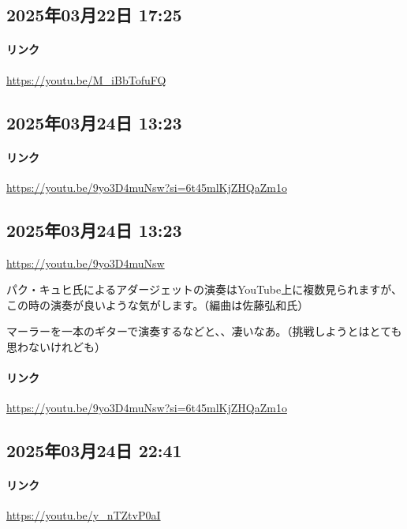 \subsection*{2025年03月22日 17:25}

\paragraph{リンク}
\url{https://youtu.be/M_iBbTofuFQ}

\subsection*{2025年03月24日 13:23}

\paragraph{リンク}
\url{https://youtu.be/9yo3D4muNsw?si=6t45mlKjZHQaZm1o}

\subsection*{2025年03月24日 13:23}

\url{https://youtu.be/9yo3D4muNsw}

パク・キュヒ氏によるアダージェットの演奏はYouTube上に複数見られますが、この時の演奏が良いような気がします。（編曲は佐藤弘和氏）

マーラーを一本のギターで演奏するなどと、、凄いなあ。（挑戦しようとはとても思わないけれども）

\paragraph{リンク}
\url{https://youtu.be/9yo3D4muNsw?si=6t45mlKjZHQaZm1o}

\subsection*{2025年03月24日 22:41}

\paragraph{リンク}
\url{https://youtu.be/y_nTZtvP0aI}

